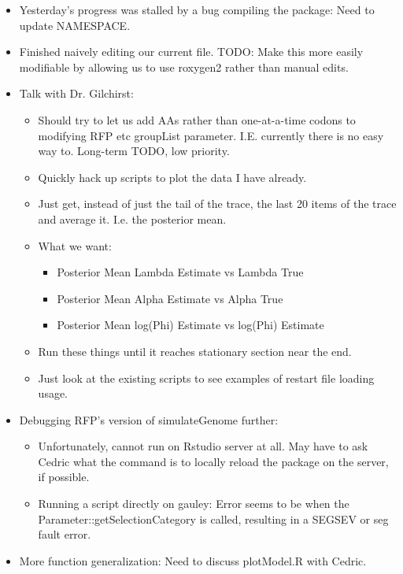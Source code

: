 \documentclass[12pt,hyperref]{labbook}
\begin{document}
\begin{itemize}
    \item Yesterday's progress was stalled by a bug compiling the package: Need to update NAMESPACE.
    \item Finished naively editing our current file. TODO: Make this more easily modifiable by allowing us to use roxygen2 rather than manual edits.
    \item Talk with Dr. Gilchirst:
    \begin{itemize}
        \item Should try to let us add AAs rather than one-at-a-time codons to modifying RFP etc groupList parameter.
        I.E. currently there is no easy way to. Long-term TODO, low priority.
        \item Quickly hack up scripts to plot the data I have already.
        \item Just get, instead of just the tail of the trace, the last 20 items of the trace and average it. I.e. the posterior mean.
        \item What we want:
        \begin{itemize}
            \item Posterior Mean Lambda Estimate vs Lambda True
            \item Posterior Mean Alpha Estimate vs Alpha True
            \item Posterior Mean log(Phi) Estimate vs log(Phi) Estimate
        \end{itemize}
        \item Run these things until it reaches stationary section near the end.
        \item Just look at the existing scripts to see examples of restart file loading usage.
    \end{itemize}
    \item Debugging RFP's version of simulateGenome further:
    \begin{itemize}
        \item Unfortunately, cannot run on Rstudio server at all.
        May have to ask Cedric what the command is to locally reload the package on the server, if possible.
        \item Running a script directly on gauley: Error seems to be when the Parameter::getSelectionCategory is called, resulting in a SEGSEV or seg fault error.
    \end{itemize}
    \item More function generalization: Need to discuss plotModel.R with Cedric.

\end{itemize}
\end{document}
